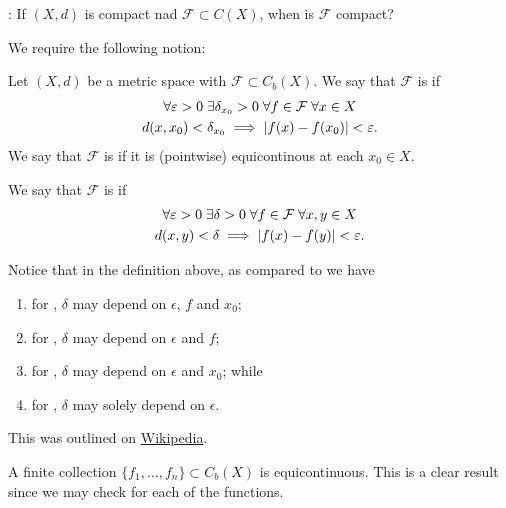 \documentclass[notoc,notitlepage]{tufte-book}
\begin{document}
: If $(X, d)$ is compact nad $\mathcal{F} \subset C(X)$, when is $\mathcal{F}$ compact?

We require the following notion:

\begin{defn}[Equicontinuity]\label{defn:equicontinuity}
  Let $(X, d)$ be a metric space with $\mathcal{F} \subset C_b(X)$. We say that $\mathcal{F}$ is  if
  \begin{gather*}
    \forall \varepsilon > 0 \; \exists \delta_{x_0} > 0 \; \forall f \in \mathcal{F} \; \forall x \in X \\
    d(x, x_0) < \delta_{x_0} \implies \left| f(x) - f(x_0) \right| < \varepsilon.
  \end{gather*}
  We say that $\mathcal{F}$ is  if it is (pointwise) equicontinous at each $x_0 \in X$.

  We say that $\mathcal{F}$ is  if
  \begin{gather*}
    \forall \varepsilon > 0 \; \exists \delta > 0 \; \forall f \in \mathcal{F} \; \forall x, y \in X \\
    d(x, y) < \delta \implies \left| f(x) - f(y) \right| < \varepsilon.
  \end{gather*}
\end{defn}

\begin{note}
  Notice that in the definition above, as compared to  we have
  \begin{enumerate}
    \item for , $\delta$ may depend on $\epsilon$, $f$ and $x_0$;
    \item for , $\delta$ may depend on $\epsilon$ and $f$;
    \item for , $\delta$ may depend on $\epsilon$ and $x_0$; while
    \item for , $\delta$ may solely depend on $\epsilon$.
  \end{enumerate}
  This was outlined on \href{https://en.wikipedia.org/wiki/Equicontinuity}{Wikipedia}.
\end{note}

\begin{eg}
  A finite collection $\{ f_1, \ldots, f_n \} \subset C_b(X)$ is equicontinuous. This is a clear result since we may check for each of the functions.
\end{eg}
\end{document}
